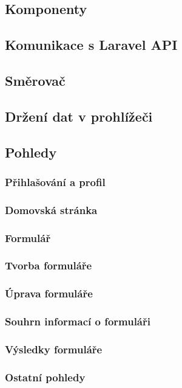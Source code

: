 	\subsection{Komponenty}
	
	\subsection{Komunikace s Laravel API}
	
	\subsection{Směrovač} %
	
	\subsection{Držení dat v prohlížeči} %
	
	\subsection{Pohledy}
		
		\subsubsection{Přihlašování a profil}
		
		\subsubsection{Domovská stránka}
		
		\subsubsection{Formulář}
		
		\subsubsection{Tvorba formuláře}
		
		\subsubsection{Úprava formuláře}
		
		\subsubsection{Souhrn informací o formuláři}
		
		\subsubsection{Výsledky formuláře}
		
		\subsubsection{Ostatní pohledy}
